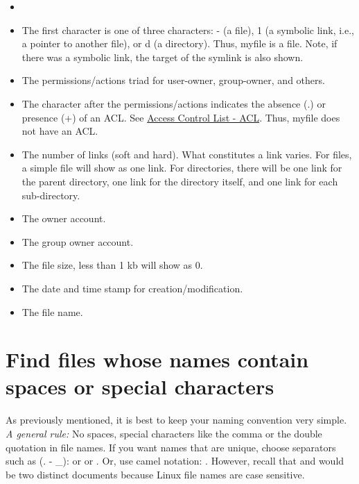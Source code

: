 \begin{itemize}
	\item[] 
	\item[] \tbi{-} The first character is one of three characters: - (a file), 1 (a symbolic link, i.e., a pointer to another file), or d (a directory). Thus, myfile is a file. Note, if there was a symbolic link, the target of the symlink is also shown.
	\item[]  The permissions/actions triad for user-owner, group-owner, and others.
	\item[]  The character after the permissions/actions indicates the absence (.) or presence (+) of an ACL. See \hyperref[ch:acl]{Access Control List - ACL}. Thus, myfile does not have an ACL.
	\item[]  The number of links (soft and hard). What constitutes a link varies. For files, a simple file will show as one link. For directories, there will be one link for the parent directory, one link for the directory itself, and one link for each sub-directory.
	\item[]  The owner account.
	\item[]  The group owner account.
	\item[]  The file size, less than 1 kb will show as 0.
	\item[]  The date and time stamp for creation/modification.
	\item[]  The file name.
\end{itemize}

\section{Find files whose names contain spaces or special characters}

As previously mentioned, it is best to keep your naming convention very simple.\textit{ A general rule:} No spaces, special characters like the comma or the double quotation in file names. If you want names that are unique, choose separators such as (. - \_):  or  or . Or, use camel notation: . However, recall that  and  would be two distinct documents because Linux file names are case sensitive. 


